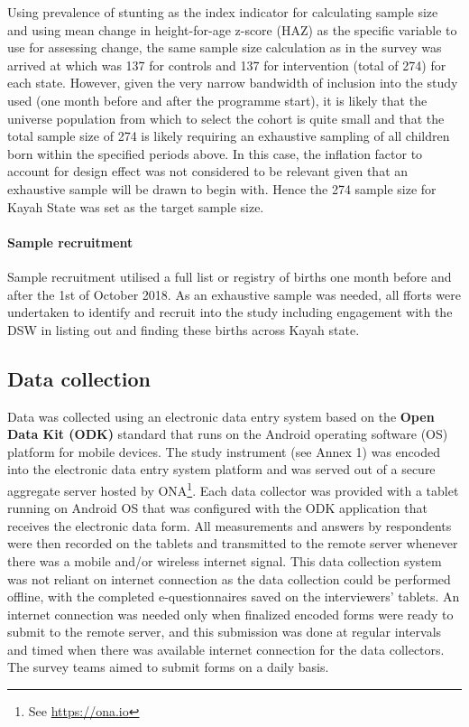 \documentclass[12pt,a4paper]{article}
\let\oldparagraph\paragraph
\renewcommand{\paragraph}[1]{\oldparagraph{#1}\mbox{}}
\let\rmarkdownfootnote\footnote%
\def\footnote{\protect\rmarkdownfootnote}
\begin{document}
Using prevalence of stunting as the index indicator for calculating sample size and using mean change in height-for-age z-score (HAZ) as the specific variable to use for assessing change, the same sample size calculation as in the survey was arrived at which was 137 for controls and 137 for intervention (total of 274) for each state.
However, given the very narrow bandwidth of inclusion into the study used (one month before and after the programme start), it is likely that the universe population from which to select the cohort is quite small and that the total sample size of 274 is likely requiring an exhaustive sampling of all children born within the specified periods above. In this case, the inflation factor to account for design effect was not considered to be relevant given that an exhaustive sample will be drawn to begin with. Hence the 274 sample size for Kayah State was set as the target sample size.

\hypertarget{sample-recruitment}{%
\paragraph{Sample recruitment}\label{sample-recruitment}}

Sample recruitment utilised a full list or registry of births one month before and after the 1st of October 2018. As an exhaustive sample was needed, all fforts were undertaken to identify and recruit into the study including engagement with the DSW in listing out and finding these births across Kayah state.

\hypertarget{data-collection}{%
\subsection{Data collection}\label{data-collection}}

Data was collected using an electronic data entry system based on the \textbf{Open Data Kit (ODK)} standard that runs on the Android operating software (OS) platform for mobile devices. The study instrument (see Annex 1) was encoded into the electronic data entry system platform and was served out of a secure aggregate server hosted by ONA\footnote{See \url{https://ona.io}}. Each data collector was provided with a tablet running on Android OS that was configured with the ODK application that receives the electronic data form. All measurements and answers by respondents were then recorded on the tablets and transmitted to the remote server whenever there was a mobile and/or wireless internet signal. This data collection system was not reliant on internet connection as the data collection could be performed offline, with the completed e-questionnaires saved on the interviewers' tablets. An internet connection was needed only when finalized encoded forms were ready to submit to the remote server, and this submission was done at regular intervals and timed when there was available internet connection for the data collectors. The survey teams aimed to submit forms on a daily basis.
\end{document}
